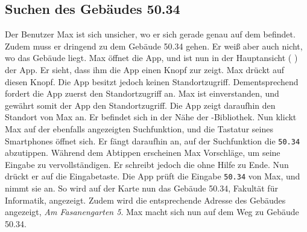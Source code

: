 \subsection{Suchen des Gebäudes 50.34}

Der Benutzer Max ist sich unsicher, wo er sich gerade genau auf dem %
befindet.
Zudem muss er dringend zu dem Gebäude 50.34 gehen.
Er weiß aber auch nicht, wo das Gebäude liegt.
Max öffnet die App, und ist nun in der Hauptansicht (%
) der App.
Er sieht, dass ihm die App einen Knopf zur %
zeigt.
Max drückt auf diesen Knopf.
Die App besitzt jedoch keinen Standortzugriff.
Dementsprechend fordert die App zuerst den Standortzugriff an.
Max ist einverstanden, und gewährt somit der App den Standortzugriff.
Die App zeigt daraufhin den Standort von Max an.
Er befindet sich in der Nähe der %
-Bibliothek.
Nun klickt Max auf der ebenfalls angezeigten Suchfunktion, und die Tastatur seines Smartphones öffnet sich.
Er fängt daraufhin an, auf der Suchfunktion die %
\texttt{50.34} abzutippen. 
Während dem Abtippen erscheinen Max Vorschläge, um seine Eingabe zu vervollständigen. 
Er schreibt jedoch die %
ohne Hilfe zu Ende. 
Nun drückt er auf die Eingabetaste. 
Die App prüft die Eingabe \texttt{50.34} von Max, und nimmt sie an. 
So wird auf der Karte nun das Gebäude 50.34, %
Fakultät für Informatik, angezeigt. 
Zudem wird die entsprechende Adresse des Gebäudes angezeigt, \textit{Am Fasanengarten 5}. 
Max macht sich nun auf dem Weg zu Gebäude 50.34.